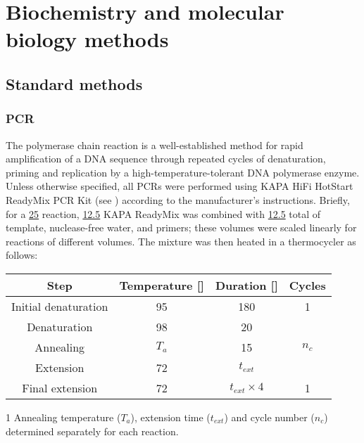 \section{Biochemistry and molecular biology methods}


\subsection{Standard methods}

\subsubsection{PCR}
\label{sec:methods_molec_standard_pcr}

The polymerase chain reaction is a well-established method for rapid amplification of a DNA sequence through repeated cycles of denaturation, priming and replication by a high-temperature-tolerant DNA polymerase enzyme. %
Unless otherwise specified, all PCRs were performed using  KAPA HiFi HotStart ReadyMix PCR Kit (see ) according to the manufacturer's instructions. Briefly, for a \ul{25} reaction, \ul{12.5} KAPA ReadyMix was combined with \ul{12.5} total of template, nuclease-free water, and primers; these volumes were scaled linearly for reactions of different volumes. The mixture was then heated in a thermocycler as follows:

\begin{center}
\begin{threeparttable}
\begin{tabular}{cccc}\toprule
\textbf{Step} & \textbf{Temperature [\degC{}]} & \textbf{Duration [\secs{}]} & \textbf{Cycles}\\\midrule
Initial denaturation & 95 & 180 & 1 \\\midrule
Denaturation & 98 & 20 & \multirow{3}{*}{$n_c$\tnote{1}}\\
Annealing & $T_a$\tnote{1} \tnote{} & 15 & \\
Extension & 72 & $t_{ext}$\tnote{1} & \\\midrule
Final extension & 72 & $t_{ext} \times 4$\tnote{1} & 1\\
\bottomrule\end{tabular}
\begin{tablenotes}
\item[1] Annealing temperature ($T_a$), extension time ($t_{ext}$) and cycle number ($n_c$) determined separately for each reaction.
\end{tablenotes}
\end{threeparttable}
\end{center}

